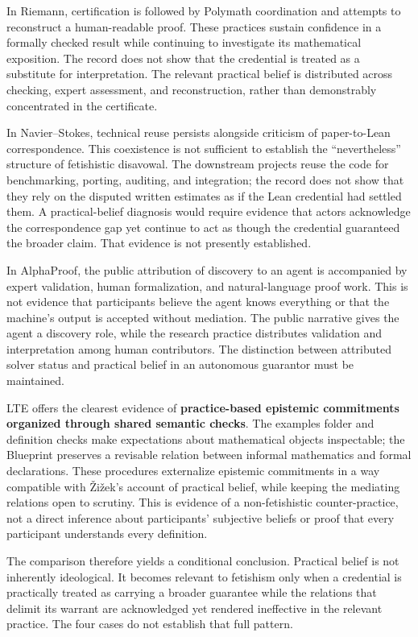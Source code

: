 \documentclass[sn-apa]{sn-jnl}
\begin{document}
In Riemann, certification is followed by Polymath coordination and attempts to reconstruct a human-readable proof. These practices sustain confidence in a formally checked result while continuing to investigate its mathematical exposition. The record does not show that the credential is treated as a substitute for interpretation. The relevant practical belief is distributed across checking, expert assessment, and reconstruction, rather than demonstrably concentrated in the certificate.

In Navier–Stokes, technical reuse persists alongside criticism of paper-to-Lean correspondence. This coexistence is not sufficient to establish the “nevertheless” structure of fetishistic disavowal. The downstream projects reuse the code for benchmarking, porting, auditing, and integration; the record does not show that they rely on the disputed written estimates as if the Lean credential had settled them. A practical-belief diagnosis would require evidence that actors acknowledge the correspondence gap yet continue to act as though the credential guaranteed the broader claim. That evidence is not presently established.

In AlphaProof, the public attribution of discovery to an agent is accompanied by expert validation, human formalization, and natural-language proof work. This is not evidence that participants believe the agent knows everything or that the machine’s output is accepted without mediation. The public narrative gives the agent a discovery role, while the research practice distributes validation and interpretation among human contributors. The distinction between attributed solver status and practical belief in an autonomous guarantor must be maintained.

LTE offers the clearest evidence of \textbf{practice-based epistemic commitments organized through shared semantic checks}. The examples folder and definition checks make expectations about mathematical objects inspectable; the Blueprint preserves a revisable relation between informal mathematics and formal declarations. These procedures externalize epistemic commitments in a way compatible with Žižek’s account of practical belief, while keeping the mediating relations open to scrutiny. This is evidence of a non-fetishistic counter-practice, not a direct inference about participants’ subjective beliefs or proof that every participant understands every definition.

The comparison therefore yields a conditional conclusion. Practical belief is not inherently ideological. It becomes relevant to fetishism only when a credential is practically treated as carrying a broader guarantee while the relations that delimit its warrant are acknowledged yet rendered ineffective in the relevant practice. The four cases do not establish that full pattern.
\end{document}
